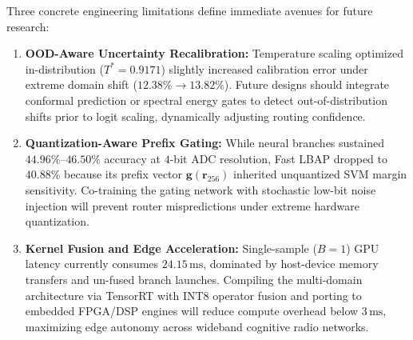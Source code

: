 Three concrete engineering limitations define immediate avenues for future research:
\begin{enumerate}
    \item \textbf{OOD-Aware Uncertainty Recalibration:} Temperature scaling optimized in-distribution ($T^* = 0.9171$) slightly increased calibration error under extreme domain shift ($12.38\% \to 13.82\%$). Future designs should integrate conformal prediction or spectral energy gates to detect out-of-distribution shifts prior to logit scaling, dynamically adjusting routing confidence.
    \item \textbf{Quantization-Aware Prefix Gating:} While neural branches sustained $44.96\%$--$46.50\%$ accuracy at $4$-bit ADC resolution, Fast LBAP dropped to $40.88\%$ because its prefix vector $\mathbf{g}(\mathbf{r}_{256})$ inherited unquantized SVM margin sensitivity. Co-training the gating network with stochastic low-bit noise injection will prevent router mispredictions under extreme hardware quantization.
    \item \textbf{Kernel Fusion and Edge Acceleration:} Single-sample ($B=1$) GPU latency currently consumes $24.15\,\mathrm{ms}$, dominated by host-device memory transfers and un-fused branch launches. Compiling the multi-domain architecture via TensorRT with INT8 operator fusion and porting to embedded FPGA/DSP engines will reduce compute overhead below $3\,\mathrm{ms}$, maximizing edge autonomy across wideband cognitive radio networks.
\end{enumerate}
